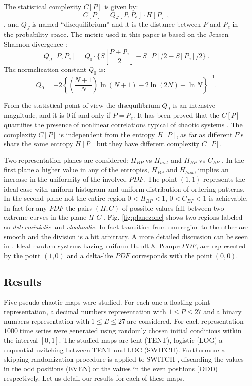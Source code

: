 The statistical complexity $C[P]$ is given by:
\begin{equation}
\label{eq:inten}
C[{P}]=Q_{J}[{P,P_e}]\cdot H[{P}] \ ,
\end{equation}
, and
$Q_{J}$ is named ``disequilibrium'' and it is the distance between $P$ and $P_e$ 
 in the probability space. The metric used in this paper is based on the Jensen-Shannon divergence
 \cite{Lamberti2004}:
\begin{equation}
\label{eq:disequi}
Q_{J}[{P,P_e}]= Q_0 \cdot \{S[\frac{P+P_e}{2}]-S[P]/2-S[P_e]/2 \} \ .
\end{equation}
The normalization constant $Q_0$ is:
\begin{equation}
\label{eq:q0j}
Q_0=-2 \left\{ \left( \frac{N+1}{N} \right) \ln(N+1) - 2 \ln(2N) + \ln N \right\}^{-1} .
\end{equation}

From the statistical point of view the disequilibrium $Q_J$ is an
intensive magnitude, and it is $0$ if and only if $P=P_e$. It has
been proved that the $C[P]$ quantifies the presence of nonlinear
correlations typical of chaotic systems
\cite{Martin2003,Lamberti2004}. The complexity $C[P]$ is
independent from the entropy $H[P]$, as far as different $P$'s share
the same entropy $H[P]$ but they have different  complexity
$C[P]$.

Two representation planes are considered: $H_{BP}$ vs $H_{hist}$ \cite{DeMicco2008} and $H_{BP}$ vs $C_{BP}$ \cite{Rosso2007C}. In the first plane a higher value in any of the entropies,  $H_{BP}$ and $H_{hist}$, implies an increase in the uniformity of the involved $PDF$. The point $(1,1)$ represents the ideal case with uniform histogram and uniform distribution of ordering patterns.  In the second plane not the entire region $0<H_{BP}<1$, $0<C_{BP}<1$ is achievable. In fact for any $PDF$ the pairs $(H,C)$ of possible values fall between two extreme curves in the plane $H$-$C$ \cite{Anteneodo1996}. Fig. \ref{fig:planezone} shows two regions labeled as \emph{deterministic} and \emph{stochastic}. In fact transition from one region to the other are smooth and the division is a bit arbitrary. A more detailed discussion can be seen in \cite{Rosso2007C}. Ideal random systems having uniform Bandt \& Pompe $PDF$, are represented by the point $(1,0)$ \cite{Gonzalez2005} and a delta-like $PDF$ corresponds with the point $(0,0)$. 


%
\subsection{Results}\label{sec:resultados}
Five pseudo chaotic maps were studied. For each one a floating point representation, a decimal numbers representation with $1\leq P \leq 27$ and a binary numbers representation with $1\leq B \leq 27$ are considered. For each representation $1000$ time series were generated using randomly chosen initial conditions within the interval $[0,1]$. 
The studied maps are tent (TENT), logistic (LOG) a sequential switching between TENT and LOG (SWITCH). Furthermore a skipping randomization procedure is applied to SWITCH \cite{DeMicco2008}, discarding the values in the odd positions (EVEN) or the values in the even positions (ODD) respectively. Let us detail our results for each of these maps. 
